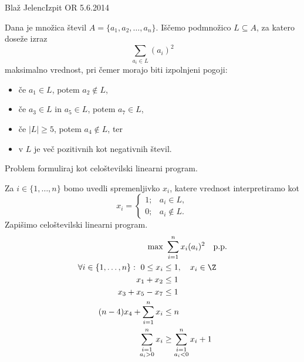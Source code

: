 \begin{naloga}{Blaž Jelenc}{Izpit OR 5.6.2014}
\begin{vprasanje}
Dana je množica števil $A = \{a_1, a_2, \dots, a_n\}$.
Iščemo podmnožico $L \subseteq A$,
za katero doseže izraz
$$
\sum_{a_i \in L} (a_i)^2
$$
maksimalno vrednost,
pri čemer morajo biti izpolnjeni pogoji:
\begin{itemize}
\item če $a_1 \in L$, potem $a_2 \not\in L$,
\item če $a_3 \in L$ in $a_5 \in L$, potem $a_7 \in L$,
\item če $|L| \ge 5$, potem $a_4 \not\in L$, ter
\item v $L$ je več pozitivnih kot negativnih števil.
\end{itemize}
Problem formuliraj kot celoštevilski linearni program.
\end{vprasanje}

\begin{odgovor}
Za $i \in \{1, \dots, n\}$ bomo uvedli spremenljivko $x_i$,
katere vrednost interpretiramo kot
$$
x_i = \begin{cases}
1; & a_i \in L, \\
0; & a_i \not\in L.
\end{cases}
$$
Zapišimo celoštevilski linearni program.
\begin{align*}
\max &\ \sum_{i=1}^n x_i (a_i)^2 \quad \text{p.p.} \\
\forall i \in \{1, \dots, n\}: \ 0 \le x_i &\le 1, \quad x_i \in \Z \\
x_1 + x_2 &\le 1 \\
x_3 + x_5 - x_7 &\le 1 \\
(n-4) x_4 + \sum_{i=1}^n x_i &\le n \\
\sum_{\substack{i=1 \\ a_i > 0}}^n x_i
&\ge \sum_{\substack{i=1 \\ a_i < 0}}^n x_i + 1
\end{align*}
\end{odgovor}
\end{naloga}
